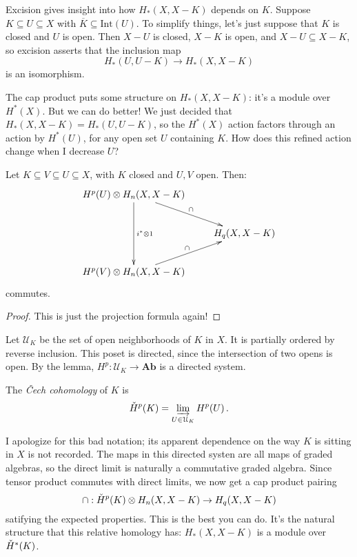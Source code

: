 Excision gives insight into how $H_\ast(X,X-K)$ depends on $K$. 
Suppose $K\subseteq U\subseteq X$ with $\overline{K}\subseteq\mathrm{Int}(U)$. To simplify things, let's just suppose that $K$ is closed and $U$ is open.
Then $X-U$ is closed, $X-K$ is open, and $X-U\subseteq X-K$, so excision asserts that the inclusion map 
\[
H_*(U,U-K)\to H_*(X,X-K)
\]
is an isomorphism. 

The cap product puts some structure on $H_*(X,X-K)$: it's a module over 
$H^*(X)$. But we can do better! We just decided that $H_*(X,X-K)=H_*(U,U-K)$,
so the $H^*(X)$ action factors through an action by $H^*(U)$, for any open 
set $U$ containing $K$. How does this refined action change when I decrease 
$U$?
\begin{lemma}
Let $K\subseteq V\subseteq U\subseteq X$, with $K$ closed and $U,V$ open. Then:
\begin{equation*}
\xymatrix{
	 H^p(U)\ar[dd]^{i^\ast\otimes 1}\otimes H_n(X,X-K)\ar[dr]^\cap & \\
	 & H_q(X,X-K)\\
	 H^p(V)\otimes H_n(X,X-K)\ar[ur]^\cap
}
\end{equation*}
commutes.
\end{lemma}
\begin{proof}
This is just the projection formula again!
\end{proof}
Let $\mathcal{U}_K$ be the set of open neighborhoods of $K$ in $X$. It is partially ordered by reverse inclusion. This poset is directed, since the intersection of two opens is open. By the lemma, $H^p:\mathcal{U}_K\to\mathbf{Ab}$ 
is a directed system. 
\begin{definition}
The {\em \v{C}ech cohomology} of $K$ is
\[
\check{H}^p(K)=\varinjlim_{U\in\mathcal{U}_K} H^p(U)\,.
\]
\end{definition}
I apologize for this bad notation; its apparent dependence on the way $K$ is sitting in $X$ is not recorded. The maps in this directed systen are all maps of graded algebras, so the direct limit is naturally a commutative graded algebra. 
Since tensor product commutes with direct limits, we now get a cap product
pairing 
\[
\cap:\check{H}^p(K)\otimes H_n(X,X-K)\to H_q(X,X-K)
\]
satifying the expected properties. 
This is the best you can do. It's the natural structure that this relative homology has: $ H_\ast(X,X-K)$ is a module over $\check{H}^\ast(K)$.

